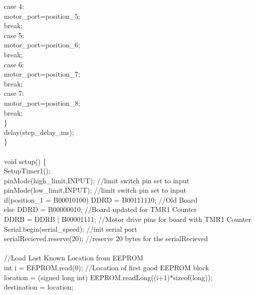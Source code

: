 {\tabto*{1cm}		case 4:\\
\tabto*{1.5cm}		motor\_port=position\_5;\\
\tabto*{1.5cm}		break;\\		
\tabto*{1cm}		case 5:\\
\tabto*{1.5cm}		motor\_port=position\_6;\\
\tabto*{1.5cm}		break;\\		
\tabto*{1cm}		case 6:\\
\tabto*{1.5cm}		motor\_port=position\_7;\\
\tabto*{1.5cm}		break;\\		
\tabto*{1cm}		case 7:\\
\tabto*{1.5cm}		motor\_port=position\_8;\\
\tabto*{1.5cm}		break;\\		
\tabto*{.5cm}	\}\\	
\tabto*{.5cm}	delay(step\_delay\_ms);\\	
\}\\
\\
void setup() \{\\
\tabto*{.5cm}	SetupTimer1();\\	
\tabto*{.5cm}	pinMode(high\_limit,INPUT);\tabto*{7.5cm}  //limit switch pin set to input\\
\tabto*{.5cm}	pinMode(low\_limit,INPUT);\tabto*{7.5cm}  //limit switch pin set to input\\	
\tabto*{.5cm}	if(position\_1 = B00010100) DDRD = B00111110;\tabto*{9.5cm}  //Old Board\\
\tabto*{.5cm}	else DDRD = B00000010;\tabto*{7.5cm}  //Board updated for TMR1 Counter\\	
\tabto*{.5cm}	DDRB = DDRB | B00001111; \tabto*{7.5cm} //Motor drive pins for board with TMR1 Counter\\	
\tabto*{.5cm}	Serial.begin(serial\_speed);\tabto*{7.5cm}  //init serial port\\
\tabto*{.5cm}	serialRecieved.reserve(20);\tabto*{7.5cm} //reserve 20 bytes for the serialRecieved\\
\\	
\tabto*{.5cm}	//Load Last Known Location from EEPROM\\
\tabto*{.5cm}	int i = EEPROM.read(0);\tabto*{7.5cm}  //Location of first good EEPROM block\\
\tabto*{.5cm}	location = (signed long int) EEPROM.readLong((i+1)*sizeof(long));\\
\tabto*{.5cm}	destination = location;\\	
}
